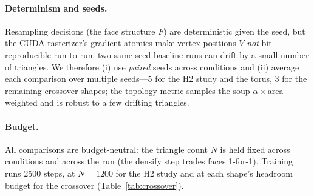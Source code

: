 \paragraph{Determinism and seeds.}
Resampling decisions (the face structure $F$) are deterministic given the seed,
but the CUDA rasterizer's gradient atomics make vertex positions $V$
\emph{not} bit-reproducible run-to-run: two same-seed baseline runs can drift by a
small number of triangles. We therefore (i) use \emph{paired} seeds across
conditions and (ii) average each comparison over multiple seeds---5 for the H2
study and the torus, 3 for the remaining crossover shapes; the topology metric
samples the soup $\alpha\!\times$area-weighted and is robust to a few drifting
triangles.

\paragraph{Budget.}
All comparisons are budget-neutral: the triangle count $N$ is held fixed across
conditions and across the run (the densify step trades faces 1-for-1). Training
runs 2500 steps, at $N{=}1200$ for the H2 study and at each shape's headroom
budget for the crossover (Table~\ref{tab:crossover}).
